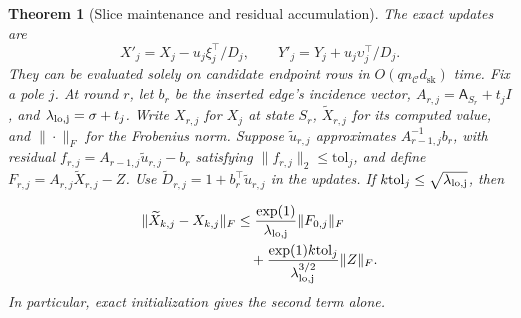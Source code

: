 \documentclass[conference]{IEEEtran}
\newtheorem{theorem}{Theorem}
\theoremstyle{definition}
\newcommand{\dsk}{d_{\mathrm{sk}}}
\newcommand{\matA}{\mathsf A}
\begin{document}
\begin{theorem}[Slice maintenance and residual accumulation]
\label{thm:maintenance}
The exact updates are
\begin{equation}
 X'_j=X_j-u_j\xi_j^\top/D_j,\qquad
 Y'_j=Y_j+u_j\upsilon_j^\top/D_j.
\label{eq:xy-update}
\end{equation}
They can be evaluated solely on candidate endpoint rows in $O(q n_{\mathcal C}\dsk)$ time.
Fix a pole $j$. At round $r$, let $b_r$ be the inserted edge's
incidence vector, $A_{r,j}=\matA_{S_r}+t_jI$, and $\lambda_{\rm lo,j}=\sigma+t_j$.
Write $X_{r,j}$ for $X_j$ at state $S_r$, $\widetilde X_{r,j}$ for its
computed value, and $\|\cdot\|_F$ for the Frobenius norm. Suppose $\widetilde u_{r,j}$
approximates $A_{r-1,j}^{-1}b_r$, with residual
$f_{r,j}=A_{r-1,j}\widetilde u_{r,j}-b_r$ satisfying
$\|f_{r,j}\|_2\le\mathrm{tol}_j$, and define
$F_{r,j}=A_{r,j}\widetilde X_{r,j}-Z$. Use
$\widetilde D_{r,j}=1+b_r^\top\widetilde u_{r,j}$ in the updates.
If $k\mathrm{tol}_j\le\sqrt{\lambda_{\rm lo,j}}$, then

\begin{equation}
\begin{aligned}
 \|\widetilde X_{k,j}-X_{k,j}\|_F
 &\le\frac{\exp(1)}{\lambda_{\rm lo,j}}\|F_{0,j}\|_F\\
 &\quad+\frac{\exp(1)k\mathrm{tol}_j}{\lambda_{\rm lo,j}^{3/2}}\|Z\|_F.
\end{aligned}
\label{eq:maintenance-error}
\end{equation}
In particular, exact initialization gives the second term alone.
\end{theorem}
\end{document}
